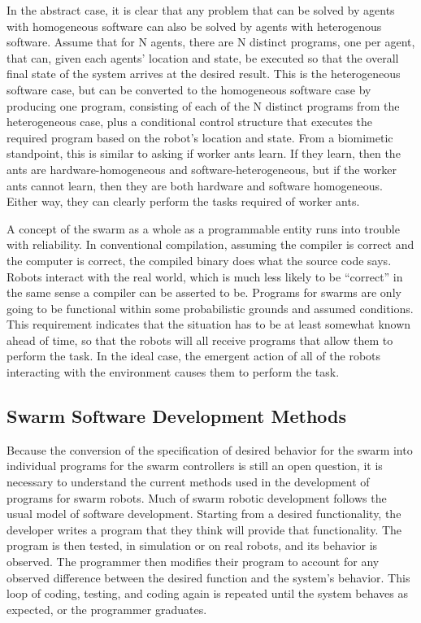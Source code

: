 \documentclass[]{article}
\begin{document}
In the abstract case, it is clear that any problem that can be solved by agents with homogeneous software can also be solved by agents with heterogenous software. 
Assume that for N agents, there are N distinct programs, one per agent, that can, given each agents' location and state, be executed so that the overall final state of the system arrives at the desired result. 
This is the heterogeneous software case, but can be converted to the homogeneous software case by producing one program, consisting of each of the N distinct programs from the heterogeneous case, plus a conditional control structure that executes the required program based on the robot's location and state.  
From a biomimetic standpoint, this is similar to asking if worker ants learn. 
If they learn, then the ants are hardware-homogeneous and software-heterogeneous, but if the worker ants cannot learn, then they are both hardware and software homogeneous. Either way, they can clearly perform the tasks required of worker ants. 

A concept of the swarm as a whole as a programmable entity runs into trouble with reliability. 
In conventional compilation, assuming the compiler is correct and the computer is correct, the compiled binary does what the source code says. 
Robots interact with the real world, which is much less likely to be ``correct'' in the same sense a compiler can be asserted to be. 
Programs for swarms are only going to be functional within some probabilistic grounds and assumed conditions. 
This requirement indicates that the situation has to be at least somewhat known ahead of time, so that the robots will all receive programs that allow them to perform the task.
In the ideal case, the emergent action of all of the robots interacting with the environment causes them to perform the task. 

\subsection{Swarm Software Development Methods}

Because the conversion of the specification of desired behavior for the swarm into individual programs for the swarm controllers is still an open question, it is necessary to understand the current methods used in the development of programs for swarm robots. 
Much of swarm robotic development follows the usual model of software development. 
Starting from a desired functionality, the developer writes a program that they think will provide that functionality.
The program is then tested, in simulation or on real robots, and its behavior is observed. 
The programmer then modifies their program to account for any observed difference between the desired function and the system's behavior. 
This loop of coding, testing, and coding again is repeated until the system behaves as expected, or the programmer graduates. 
\end{document}
